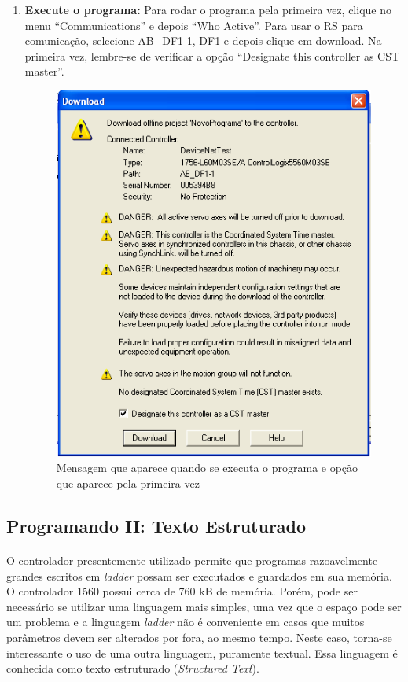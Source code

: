 \documentclass[a4paper,11pt]{scrartcl} %
\numberwithin{equation}{section} %
\numberwithin{figure}{section} %
\numberwithin{table}{section} %
\begin{document}
\begin{enumerate}
     \item \textbf{Execute o programa: } Para rodar o programa pela primeira vez, clique no menu ``Communications'' e depois ``Who Active''. Para usar o RS para comunicação, selecione AB\_DF1-1, DF1 e depois clique em download. Na primeira vez, lembre-se de verificar a opção ``Designate this controller as CST master''.
	
	\begin{figure}[H]
       \centering
              \includegraphics[width=0.9\linewidth]{figures/software/step23}
              \caption{Mensagem que aparece quando se executa o programa e opção que aparece pela primeira vez\label{mensagemRodar}}
          \end{figure}
\end{enumerate}

\subsection{Programando II: Texto Estruturado}
\paragraph{} O controlador presentemente utilizado permite que programas razoavelmente grandes escritos em \textit{ladder} possam ser executados e guardados em sua memória. O controlador 1560 possui cerca de 760 kB de memória. Porém, pode ser necessário se utilizar uma linguagem mais simples, uma vez que o espaço pode ser um problema e a linguagem \textit{ladder} não é conveniente em casos que muitos parâmetros devem ser alterados por fora, ao mesmo tempo. Neste caso, torna-se interessante o uso de uma outra linguagem, puramente textual. Essa linguagem é conhecida como texto estruturado (\textit{Structured Text}).
\end{document}
